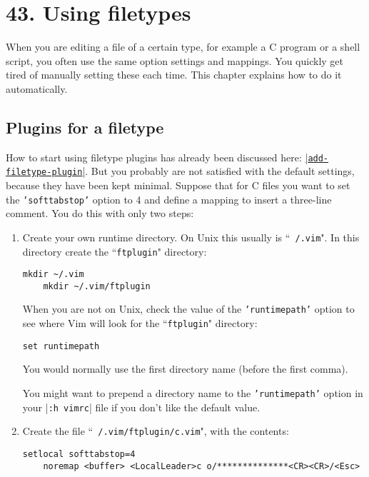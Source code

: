\section{43. Using filetypes}
When you are editing a file of a certain type, for example a C program or a shell script, you often use the same option settings and mappings.
You quickly get tired of manually setting these each time.
This chapter explains how to do it automatically.
\localtableofcontents
\subsection{Plugins for a filetype}            
\label{filetype-plugin}
How to start using filetype plugins has already been discussed here: \hyperref[add-filetype-plugin]{|\texttt{add-filetype-plugin}|}.
But you probably are not satisfied with the default settings, because they have been kept minimal.
Suppose that for C files you want to set the \texttt{'softtabstop'} option to 4 and define a mapping to insert a three-line comment.
You do this with only two steps:

\label{your-runtime-dir}
\begin{enumerate}
				\item Create your own runtime directory.
								On Unix this usually is ``\texttt{~/.vim}".
								In this directory create the ``\texttt{ftplugin}" directory:

								\begin{Verbatim}[samepage=true]
	mkdir ~/.vim
	mkdir ~/.vim/ftplugin
								\end{Verbatim}


								When you are not on Unix, check the value of the \texttt{'runtimepath'} option to see where Vim will look for the ``\texttt{ftplugin}" directory:

								\begin{Verbatim}[samepage=true]
 set runtimepath
								\end{Verbatim}

								You would normally use the first directory name (before the first comma).

								You might want to prepend a directory name to the \texttt{'runtimepath'} option in your |\texttt{:h vimrc}| file if you don't like the default value.

				\item Create the file ``\texttt{~/.vim/ftplugin/c.vim}", with the contents:
								\begin{Verbatim}[samepage=true]
	setlocal softtabstop=4
	noremap <buffer> <LocalLeader>c o/**************<CR><CR>/<Esc>
								\end{Verbatim}
\end{enumerate}

